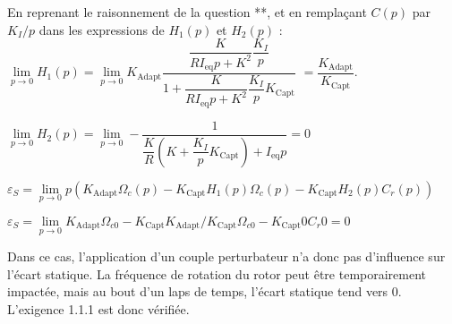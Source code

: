\ifprof
\begin{corrige}


En reprenant le raisonnement de la question **, et en remplaçant $C(p)$ par $K_I/p$ dans les expressions de $H_1 (p)$ et $H_2 (p)$ :
$\lim\limits_{p\to 0}  H_1 (p)=\lim\limits_{p\to 0}  K_{\text{Adapt}} \dfrac{\dfrac{K}{R I_{\text{eq}} p+K^2}\dfrac{ K_I}{p}}{1+\dfrac{K}{R I_{\text{eq}} p+K^2 } \dfrac{K_I}{p} K_{\text{Capt}} }$
$=\dfrac{K_{\text{Adapt}}}{K_{\text{Capt}}}$.

$\lim\limits_{p\to 0}  H_2 (p)=\lim\limits_{p\to 0}  -\dfrac{1}{\dfrac{K}{R} \left(K+\dfrac{K_I}{p} K_{\text{Capt}} \right)+I_{\text{eq}} p}=0$

$\varepsilon_S=\lim\limits_{p\to 0}  p \left(K_{\text{Adapt}} \Omega_c (p)-K_{\text{Capt}} H_1 (p) \Omega_c (p)-K_{\text{Capt}} H_2 (p) C_r (p)\right) $

$\varepsilon_S=\lim\limits_{p\to 0} K_{\text{Adapt}} \Omega_{c0}-K_{\text{Capt}} K_{\text{Adapt}}/K_{\text{Capt}}  \Omega_{c0}-K_{\text{Capt}} 0 C_r0 =0$

Dans ce cas, l’application d’un couple perturbateur n’a donc pas d’influence sur l’écart statique. La fréquence de rotation du rotor peut être temporairement impactée, mais au bout d’un laps de temps, l’écart statique tend vers 0. L’exigence 1.1.1 est donc vérifiée.

\end{corrige}
\else
\fi


\ifprof
\else
{}
\fi

